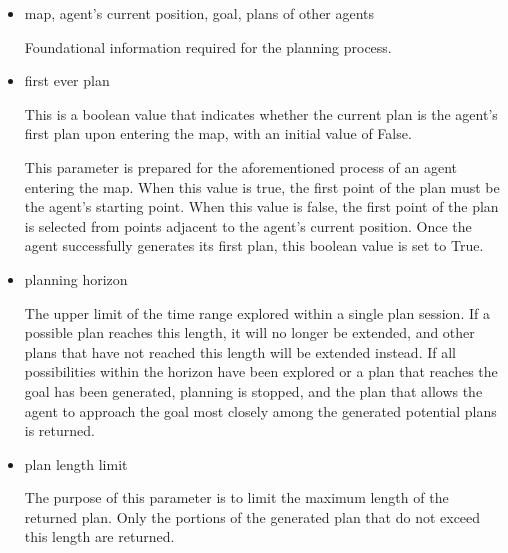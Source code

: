 \begin{itemize}
    \item map, agent's current position, goal, plans of other agents

    Foundational information required for the planning process.

    \item first ever plan
    
    This is a boolean value that indicates whether the current plan is the agent's first plan upon entering the map, with an initial value of False.


    This parameter is prepared for the aforementioned process of an agent entering the map. When this value is true, the first point of the plan must be the agent's starting point. When this value is false, the first point of the plan is selected from points adjacent to the agent's current position.
    Once the agent successfully generates its first plan, this boolean value is set to True.


    \item planning horizon

    The upper limit of the time range explored within a single plan session. 
    If a possible plan reaches this length, it will no longer be extended, and other plans that have not reached this length will be extended instead.
    If all possibilities within the horizon have been explored or a plan that reaches the goal has been generated, planning is stopped, 
    and the plan that allows the agent to approach the goal most closely among the generated potential plans is returned.



    \item plan length limit
    
    The purpose of this parameter is to limit the maximum length of the returned plan. Only the portions of the generated plan that do not exceed this length are returned.
    

    
\end{itemize}

